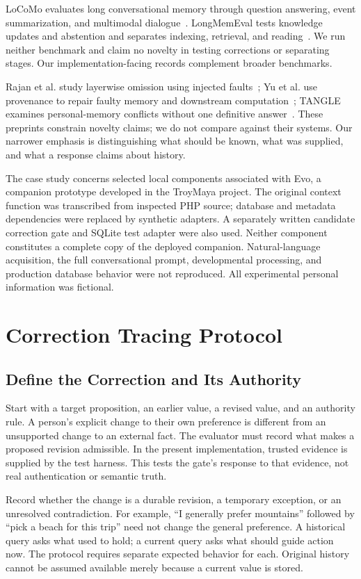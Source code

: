 \documentclass[runningheads]{llncs}
\begin{document}
LoCoMo evaluates long conversational memory through question answering, event summarization, and multimodal dialogue~\cite{locomo}. LongMemEval tests knowledge updates and abstention and separates indexing, retrieval, and reading~\cite{longmemeval}. We run neither benchmark and claim no novelty in testing corrections or separating stages. Our implementation-facing records complement broader benchmarks.

Rajan et al. study layerwise omission using injected faults~\cite{omission}; Yu et al. use provenance to repair faulty memory and downstream computation~\cite{rollback}; TANGLE examines personal-memory conflicts without one definitive answer~\cite{tangle}. These preprints constrain novelty claims; we do not compare against their systems. Our narrower emphasis is distinguishing what should be known, what was supplied, and what a response claims about history.

The case study concerns selected local components associated with Evo, a companion prototype developed in the TroyMaya project. The original context function was transcribed from inspected PHP source; database and metadata dependencies were replaced by synthetic adapters. A separately written candidate correction gate and SQLite test adapter were also used. Neither component constitutes a complete copy of the deployed companion. Natural-language acquisition, the full conversational prompt, developmental processing, and production database behavior were not reproduced. All experimental personal information was fictional.

\section{Correction Tracing Protocol}
\subsection{Define the Correction and Its Authority}
Start with a target proposition, an earlier value, a revised value, and an authority rule. A person's explicit change to their own preference is different from an unsupported change to an external fact. The evaluator must record what makes a proposed revision admissible. In the present implementation, trusted evidence is supplied by the test harness. This tests the gate's response to that evidence, not real authentication or semantic truth.

Record whether the change is a durable revision, a temporary exception, or an unresolved contradiction. For example, ``I generally prefer mountains'' followed by ``pick a beach for this trip'' need not change the general preference. A historical query asks what used to hold; a current query asks what should guide action now. The protocol requires separate expected behavior for each. Original history cannot be assumed available merely because a current value is stored.
\end{document}
